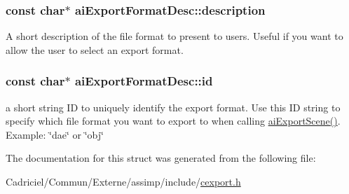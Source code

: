 \subsubsection[{\texorpdfstring{description}{description}}]{\setlength{\rightskip}{0pt plus 5cm}const char$\ast$ ai\+Export\+Format\+Desc\+::description}\hypertarget{structai_export_format_desc_a9c84c4b07c5177fb6539b9bdf90236fb}{}\label{structai_export_format_desc_a9c84c4b07c5177fb6539b9bdf90236fb}
A short description of the file format to present to users. Useful if you want to allow the user to select an export format. 
\subsubsection[{\texorpdfstring{id}{id}}]{\setlength{\rightskip}{0pt plus 5cm}const char$\ast$ ai\+Export\+Format\+Desc\+::id}\hypertarget{structai_export_format_desc_afe216eaea3a04abca041e5c253f94bbf}{}\label{structai_export_format_desc_afe216eaea3a04abca041e5c253f94bbf}
a short string ID to uniquely identify the export format. Use this ID string to specify which file format you want to export to when calling \hyperlink{cexport_8h_a9615510b8430a9da4f435a72148128dd}{ai\+Export\+Scene()}. Example\+: \char`\"{}dae\char`\"{} or \char`\"{}obj\char`\"{} 

The documentation for this struct was generated from the following file\+:\begin{DoxyCompactItemize}
\item 
Cadriciel/\+Commun/\+Externe/assimp/include/\hyperlink{cexport_8h}{cexport.\+h}\end{DoxyCompactItemize}
